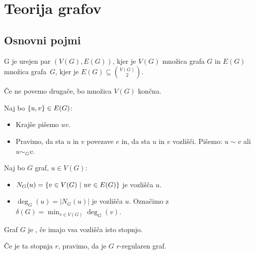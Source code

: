 \section{Teorija grafov}
\subsection{Osnovni pojmi}
\begin{definicija}
     G je urejen par $(V(G), E(G))$, kjer je $V(G)$ množica  grafa $G$ in $E(G)$ množica  grafa~$G$, kjer je $E(G) \subseteq \binom{V(G)}{2}$.
\end{definicija}

\begin{opomba}
    Če ne povemo drugače, bo množica $V(G)$ končna.
\end{opomba}

\begin{opomba}
    Naj bo $\left\{u, v\right\} \in E(G)$:
    \begin{itemize}
        \item Krajše pišemo $uv$.
        \item Pravimo, da sta $u$ in $v$  povezave $e$ in, da sta $u$ in $v$  vozlišči.        
        Pišemo: $u \sim v$ ali $u \sim_G v$.
    \end{itemize}
\end{opomba}

\begin{definicija}
    Naj bo $G$ graf, $u \in V(G)$:
    \begin{itemize}
        \item $N_G(u) = \left\{v \in V(G) \ | \ uv \in E(G)\right\}$ je  vozlišča $u$.
        \item $\deg_G(u) = |N_G(u)|$ je  vozlišča $u$. Označimo z $\delta(G) = \min_{v \in V(G)}\deg_G(v)$.
    \end{itemize}
\end{definicija}

\begin{definicija}
    Graf $G$ je , če imajo vsa vozlišča isto stopnjo.
\end{definicija}

\begin{opomba}
    Če je ta stopnja $r$, pravimo, da je $G$ $r$-regularen graf.
\end{opomba}

